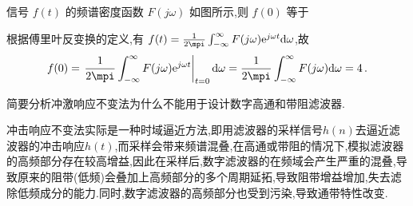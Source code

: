 \documentclass[list,answers,csize4,custom]{sysuexam}
\begin{document}
\begin{groups}
\begin{questions}[rs]
    \question[5]  信号 $f(t)$ 的频谱密度函数 $F(j \omega)$ 如图所示,则 $f(0)$ 等于
    \begin{center}
    \end{center}
    \begin{solution}
        \analysis 根据傅里叶反变换的定义,有 $f(t)=\frac{1}{2 \mpi} \int_{-\infty}^{\infty} F(j \omega) \mathrm{e}^{j \omega t} \mathrm{d} \omega$,故
        $$
    f(0)=\left.\frac{1}{2 \mpi} \int_{-\infty}^{\infty} F(j \omega) \mathrm{e}^{j \omega t}\right|_{t=0} \mathrm{d} \omega=\frac{1}{2 \mpi} \int_{-\infty}^{\infty} F(j \omega) \mathrm{d} \omega=4\,.
    $$
    \end{solution}
    
\end{questions}

\begin{questions}
    \question[10] 简要分析冲激响应不变法为什么不能用于设计数字高通和带阻滤波器.
    \begin{solution}
        \ans 冲击响应不变法实际是一种时域逼近方法,即用滤波器的采样信号$h(n)$去逼近滤波器的冲击响应$h(t)$,而采样会带来频谱混叠,在高通或带阻的情况下,模拟滤波器的高频部分存在较高增益,因此在采样后,数字滤波器的在频域会产生严重的混叠,导致原来的阻带(低频)会叠加上高频部分的多个周期延拓,导致阻带增益增加,失去滤除低频成分的能力.同时,数字滤波器的高频部分也受到污染,导致通带特性改变.
    \end{solution}
\end{questions}


\end{groups}
\end{document}
